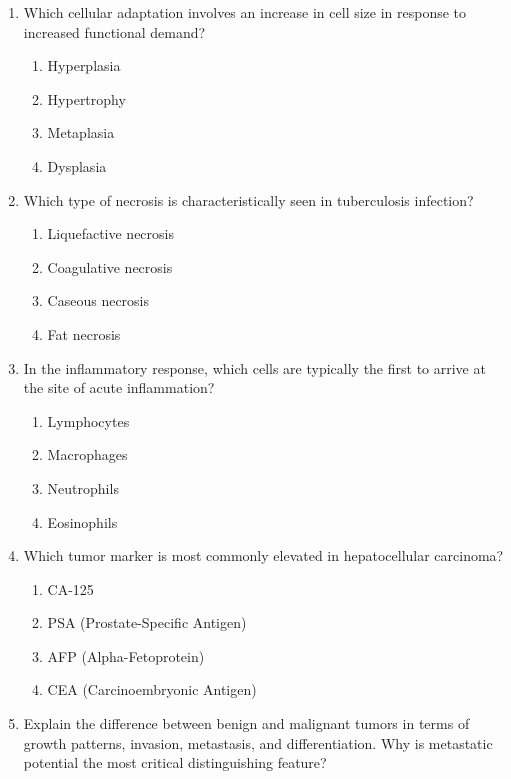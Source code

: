 \documentclass[11pt]{article}
\begin{document}
\begin{enumerate}[label=\textbf{\arabic*.}]

  \item Which cellular adaptation involves an increase in cell size in response to increased 
  functional demand?
  \begin{enumerate}[label=(\Alph*)]
    \item Hyperplasia
    \item Hypertrophy
    \item Metaplasia
    \item Dysplasia
  \end{enumerate}

  \item Which type of necrosis is characteristically seen in tuberculosis infection?
  \begin{enumerate}[label=(\Alph*)]
    \item Liquefactive necrosis
    \item Coagulative necrosis
    \item Caseous necrosis
    \item Fat necrosis
  \end{enumerate}

  \item In the inflammatory response, which cells are typically the first to arrive at the site of 
  acute inflammation?
  \begin{enumerate}[label=(\Alph*)]
    \item Lymphocytes
    \item Macrophages
    \item Neutrophils
    \item Eosinophils
  \end{enumerate}

  \item Which tumor marker is most commonly elevated in hepatocellular carcinoma?
  \begin{enumerate}[label=(\Alph*)]
    \item CA-125
    \item PSA (Prostate-Specific Antigen)
    \item AFP (Alpha-Fetoprotein)
    \item CEA (Carcinoembryonic Antigen)
  \end{enumerate}

  \item Explain the difference between benign and malignant tumors in terms of growth patterns, 
  invasion, metastasis, and differentiation. Why is metastatic potential the most critical 
  distinguishing feature?


\end{enumerate}
\end{document}
